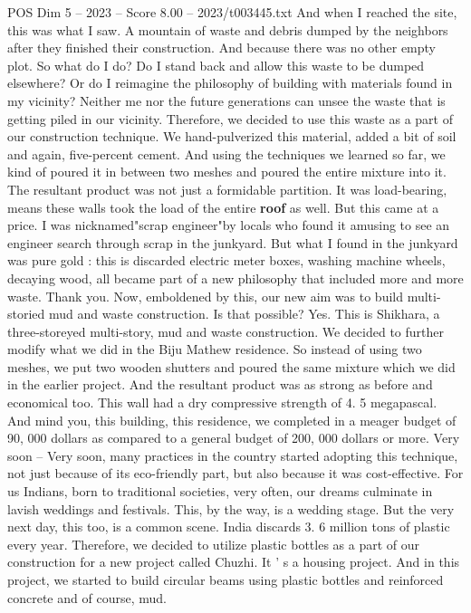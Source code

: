 \begin{textsample}{POS Dim 5 – 2023 – Score 8.00 – 2023/t003445.txt}
And when I reached the site, this was what I saw.
A mountain of waste and debris dumped by the neighbors after they finished their construction.
And because there was no other empty plot.
So what do I do?
Do I stand back and allow this waste to be dumped elsewhere?
Or do I reimagine the philosophy of building with materials found in my vicinity?
Neither me nor the future generations can unsee the waste that is getting piled in our vicinity.
Therefore, we decided to use this waste as a part of our construction technique.
We hand-pulverized this material, added a bit of soil and again, five-percent cement.
And using the techniques we learned so far, we kind of poured it in between two meshes and poured the entire mixture into it.
The resultant product was not just a formidable partition.
It was load-bearing, means these walls took the load of the entire \textbf{roof} as well.
But this came at a price.
I was nicknamed"scrap engineer"by locals who found it amusing to see an engineer search through scrap in the junkyard.
But what I found in the junkyard was pure gold : this is discarded electric meter boxes, washing machine wheels, decaying wood, all became part of a new philosophy that included more and more waste.
Thank you.
Now, emboldened by this, our new aim was to build multi-storied mud and waste construction.
Is that possible?
Yes.
This is Shikhara, a three-storeyed multi-story, mud and waste construction.
We decided to further modify what we did in the Biju Mathew residence.
So instead of using two meshes, we put two wooden shutters and poured the same mixture which we did in the earlier project.
And the resultant product was as strong as before and economical too.
This wall had a dry compressive strength of 4. 5 megapascal.
And mind you, this building, this residence, we completed in a meager budget of 90, 000 dollars as compared to a general budget of 200, 000 dollars or more.
Very soon -- Very soon, many practices in the country started adopting this technique, not just because of its eco-friendly part, but also because it was cost-effective.
For us Indians, born to traditional societies, very often, our dreams culminate in lavish weddings and festivals.
This, by the way, is a wedding stage.
But the very next day, this too, is a common scene.
India discards 3. 6 million tons of plastic every year.
Therefore, we decided to utilize plastic bottles as a part of our construction for a new project called Chuzhi.
It ' s a housing project.
And in this project, we started to build circular beams using plastic bottles and reinforced concrete and of course, mud.

\end{textsample}
